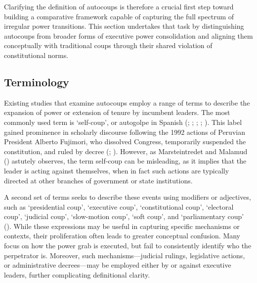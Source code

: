 \documentclass[
  12pt,
]{report}
\begin{document}
Clarifying the definition of autocoups is therefore a crucial first step
toward building a comparative framework capable of capturing the full
spectrum of irregular power transitions. This section undertakes that
task by distinguishing autocoups from broader forms of executive power
consolidation and aligning them conceptually with traditional coups
through their shared violation of constitutional norms.

\subsection*{Terminology}\label{terminology}

Existing studies that examine autocoups employ a range of terms to
describe the expansion of power or extension of tenure by incumbent
leaders. The most commonly used term is `self-coup', or autogolpe in
Spanish (;
;
; ; ). This label gained prominence in scholarly discourse following
the 1992 actions of Peruvian President Alberto Fujimori, who dissolved
Congress, temporarily suspended the constitution, and ruled by decree
(;
). However, as
Marsteintredet and Malamud ()
astutely observes, the term self-coup can be misleading, as it implies
that the leader is acting against themselves, when in fact such actions
are typically directed at other branches of government or state
institutions.

A second set of terms seeks to describe these events using modifiers or
adjectives, such as `presidential coup', `executive coup',
`constitutional coup', `electoral coup', `judicial coup', `slow-motion
coup', `soft coup', and `parliamentary coup'
().
While these expressions may be useful in capturing specific mechanisms
or contexts, their proliferation often leads to greater conceptual
confusion. Many focus on how the power grab is executed, but fail to
consistently identify who the perpetrator is. Moreover, such
mechanisms---judicial rulings, legislative actions, or administrative
decrees---may be employed either by or against executive leaders,
further complicating definitional clarity.
\end{document}
